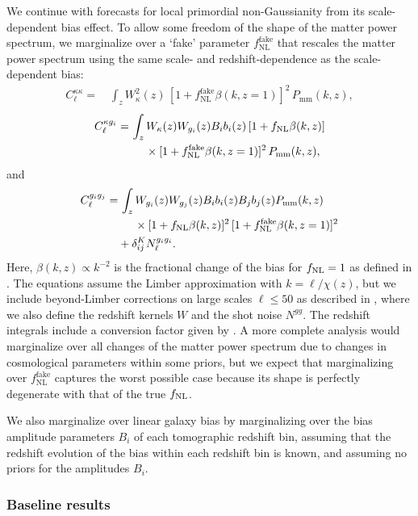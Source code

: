 \documentclass[prd,superscriptaddress,floatfix,notitlepage,nofootinbib,reprint]{revtex4-1} %
\begin{document}
We continue with forecasts for local primordial non-Gaussianity from its scale-dependent bias effect.
To allow some freedom of the shape of the matter power spectrum, 
we marginalize
over a `fake' parameter $f_\mathrm{NL}^\mathrm{fake}$ that rescales the matter power spectrum using the same scale- and redshift-dependence as the scale-dependent bias:
\begin{align}
  C^{\kappa\kappa}_\ell =&\, \int_z W_\kappa^2(z)\,[1+f_\mathrm{NL}^\mathrm{fake}\beta(k,z=1)]^2\, P_{\mathrm{mm}}(k,z),
\label{eq:Ckkfnl}
\end{align}
\begin{align}
  C^{\kappa g_i}_\ell =&\, \int_z W_\kappa(z)W_{g_i}(z) B_i b_i(z)\,[1+f_\mathrm{NL}\beta(k,z)]\nonumber\\
&\quad\;\,\times[1+f_\mathrm{NL}^\mathrm{fake}\beta(k,z=1)]^2\,P_{\mathrm{mm}}(k,z),
\label{eq:Ckgfnl}
\end{align}
and
\begin{align}
  C^{g_ig_j}_\ell =&\, 
\int_z W_{g_i}(z)W_{g_j}(z) B_ib_i(z) B_jb_j(z)P_{\mathrm{mm}}(k,z)\nonumber\\
&\quad\;\,\times[1+f_\mathrm{NL}\beta(k,z)]^2\,[1+f_\mathrm{NL}^\mathrm{fake}\beta(k,z=1)]^2
\nonumber\\
& + \delta_{ij}^K N^{g_ig_i}_\ell.
\label{eq:Cggfnl}
\end{align}
Here, $\beta(k,z)\propto k^{-2}$ is the fractional change of the bias for ${f_\mathrm{NL}}=1$ as defined in .
The equations assume the Limber approximation with $k=\ell/\chi(z)$, but we include beyond-Limber corrections on large scales $\ell\le 50$ as described in , where we also define the redshift kernels $W$ and the shot noise $N^{gg}$.
The redshift integrals include a conversion factor given by .
A more complete analysis would marginalize over all changes of the matter power spectrum due to changes in cosmological parameters within some priors, but we expect that marginalizing over $f_\mathrm{NL}^\mathrm{fake}$ captures the worst possible case because its shape is perfectly degenerate with that of the true ${f_\mathrm{NL}}$.


We also marginalize over linear galaxy bias by marginalizing over the bias amplitude parameters $B_i$ of each tomographic redshift bin, assuming that the redshift evolution of the bias within each redshift bin is known, and assuming no priors for the amplitudes $B_i$.



\subsubsection{Baseline results}
\end{document}
